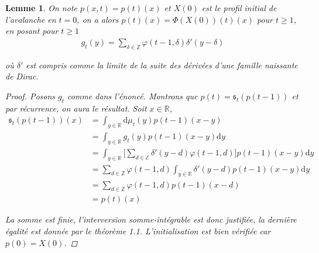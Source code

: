 \documentclass{article}
\newtheorem{lemma}[theorem]{Lemme}
\theoremstyle{definition}
\begin{document}
\begin{lemma}
	On note $p(x,t) = p(t)(x)$ et  $X(0)$ est le profil initial de l'avalanche en $t=0$, on a alors $p(t)(x) = \Phi(X(0))(t)(x)$ pour $t\geq 1$, en posant pour $t\geq 1$
	\begin{align*}
		g_t(y) = \sum_{\delta \in \mathbb{Z}}\varphi(t-1,\delta)\delta'(y-\delta)
	\end{align*}

	où $\delta'$ est compris comme la limite de la suite des dérivées d'une famille naissante de Dirac. 
	\begin{proof}
		Posons $g_t$ comme dans l'énoncé. Montrons que $p(t) = \mathfrak{s}_t(p(t-1))$ et par récurrence, on aura le résultat. Soit $x\in\mathbb{R}$,  
		\begin{align*}
			\mathfrak{s}_t(p(t-1))(x) &= \int_{y\in\mathbb{R}}\mathrm{d}\mu_t(y)p(t-1)(x-y)\\
						  &= \int_{y\in\mathbb{R}} g_t(y)p(t-1)(x-y)\mathrm{d}y\\
						  &= \int_{y\in\mathbb{R}} \bigg [\sum_{d\in \mathcal{E}}\delta'(y-d)\varphi(t-1,d)\bigg]p(t-1)(x-y)\mathrm{d}y\\
						  &= \sum_{d\in\mathbb{Z}}\varphi(t-1,d) \int_{y\in\mathbb{R}}\delta'(y-d) p(t-1)(x-y)\mathrm{d}y\\
						  &= \sum_{d\in\mathbb{Z}}\varphi(t-1,d) p(t-1)(x-d) \\
						  &= p(t)(x)
		\end{align*}

		La somme est finie, l'interversion somme-intégrable est donc justifiée, la dernière égalité est donnée par le théorème 1.1. L'initialisation est bien vérifiée car $p(0) = X(0)$.

	\end{proof}
\end{lemma}
\end{document}
